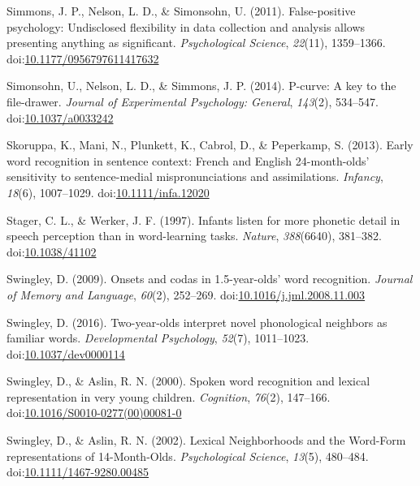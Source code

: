 \documentclass[man]{apa6}
\theoremstyle{definition}
\theoremstyle{definition}
\theoremstyle{definition}
\theoremstyle{remark}
\begin{document}
\hypertarget{ref-Simmons2011}{}
Simmons, J. P., Nelson, L. D., \& Simonsohn, U. (2011). False-positive
psychology: Undisclosed flexibility in data collection and analysis
allows presenting anything as significant. \emph{Psychological Science},
\emph{22}(11), 1359--1366.
doi:\href{https://doi.org/10.1177/0956797611417632}{10.1177/0956797611417632}

\hypertarget{ref-pcurve}{}
Simonsohn, U., Nelson, L. D., \& Simmons, J. P. (2014). P-curve: A key
to the file-drawer. \emph{Journal of Experimental Psychology: General},
\emph{143}(2), 534--547.
doi:\href{https://doi.org/10.1037/a0033242}{10.1037/a0033242}

\hypertarget{ref-Skoruppa2013}{}
Skoruppa, K., Mani, N., Plunkett, K., Cabrol, D., \& Peperkamp, S.
(2013). Early word recognition in sentence context: French and English
24-month-olds' sensitivity to sentence-medial mispronunciations and
assimilations. \emph{Infancy}, \emph{18}(6), 1007--1029.
doi:\href{https://doi.org/10.1111/infa.12020}{10.1111/infa.12020}

\hypertarget{ref-Stager1997}{}
Stager, C. L., \& Werker, J. F. (1997). Infants listen for more phonetic
detail in speech perception than in word-learning tasks. \emph{Nature},
\emph{388}(6640), 381--382.
doi:\href{https://doi.org/10.1038/41102}{10.1038/41102}

\hypertarget{ref-Swingley2009}{}
Swingley, D. (2009). Onsets and codas in 1.5-year-olds' word
recognition. \emph{Journal of Memory and Language}, \emph{60}(2),
252--269.
doi:\href{https://doi.org/10.1016/j.jml.2008.11.003}{10.1016/j.jml.2008.11.003}

\hypertarget{ref-Swingley2016}{}
Swingley, D. (2016). Two-year-olds interpret novel phonological
neighbors as familiar words. \emph{Developmental Psychology},
\emph{52}(7), 1011--1023.
doi:\href{https://doi.org/10.1037/dev0000114}{10.1037/dev0000114}

\hypertarget{ref-Swingley2000}{}
Swingley, D., \& Aslin, R. N. (2000). Spoken word recognition and
lexical representation in very young children. \emph{Cognition},
\emph{76}(2), 147--166.
doi:\href{https://doi.org/10.1016/S0010-0277(00)00081-0}{10.1016/S0010-0277(00)00081-0}

\hypertarget{ref-Swingley2002}{}
Swingley, D., \& Aslin, R. N. (2002). Lexical Neighborhoods and the
Word-Form representations of 14-Month-Olds. \emph{Psychological
Science}, \emph{13}(5), 480--484.
doi:\href{https://doi.org/10.1111/1467-9280.00485}{10.1111/1467-9280.00485}
\end{document}
